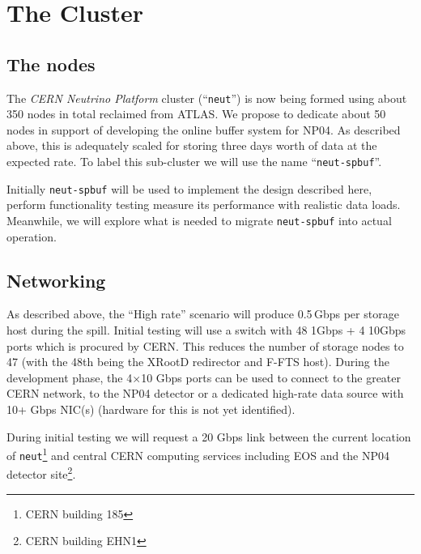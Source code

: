\documentclass[pdftex,12pt,letter]{article}
\newcommand{\xrd}{XRootD\xspace}
\begin{document}


\section{The Cluster}
\subsection{The nodes}

The \textit{CERN Neutrino Platform} cluster (``\texttt{neut}'') is now being formed using about 350 nodes in
total reclaimed from ATLAS.  We propose to dedicate about 50 nodes in
support of developing the online buffer system for NP04.  
As described above, this is adequately scaled for storing three days worth of
data at the expected rate. To label this sub-cluster we will use the name ``\texttt{neut-spbuf}''.

Initially \texttt{neut-spbuf} will be used to implement the design
described here, perform functionality testing measure its performance
with realistic data loads.  Meanwhile, we will explore what is needed
to migrate \texttt{neut-spbuf} into actual operation.

\subsection{Networking}

As described above, the ``High rate'' scenario will produce 0.5\,Gbps
per storage host during the spill.  Initial testing will use a switch
with 48 1Gbps + 4 10Gbps ports which is procured by CERN.  This
reduces the number of storage nodes to 47 (with the 48th being the
\xrd redirector and F-FTS host).  During the development phase, the
4$\times$10 Gbps ports can be used to connect to the greater CERN
network, to the NP04 detector or a dedicated high-rate data source
with 10+ Gbps NIC(s) (hardware for this is not yet identified).

During initial testing we will request a 20 Gbps link between the
current location of \texttt{neut}\footnote{CERN building 185} and
central CERN computing services including EOS and the NP04 detector
site\footnote{CERN building EHN1}.
\end{document}
